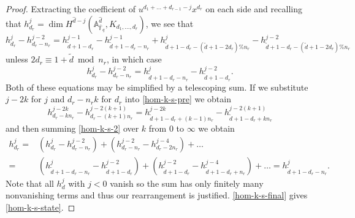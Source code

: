 \documentclass[11pt,letterpaper]{article}
\theoremstyle{definition}
\theoremstyle{remark}
\numberwithin{equation}{section}
\theoremstyle{dotless}
\renewcommand{\tilde}{\widetilde}
\begin{document}
\begin{proof}
Extracting the coefficient of $u^{ d_1 + \dots + d_{r-1}-j}  x^{d_r}$ on each side and recalling that $h^j_{d_r} =  \dim H^{\hat{d}-j} ( \mathbb A^{\hat{d} }_{\overline{\mathbb F}_q}, K_{d_1,\dots, d_r}) $, we see that
\begin{equation}\label{hom-k-g-pre}  h^j_{d_r} - h^{j-2}_{d_r-{n_r}}  =  h^{j-1 }_{\tilde{d} +1 -d_r} -  h^{j-1}_{\tilde{d}+1 -d_r-n_r} + h^j_{ \tilde{d}+1-d_r - ( \tilde{d}+1-2d_r)\%n_r}  -  h^{j-2} _{\tilde{d}+1-d_r - ( \tilde{d}+1-2d_r)\%n_r} \end{equation}
unless $2d_{r} \equiv 1 + \tilde{d} \bmod n_r$, in which case
\begin{equation}\label{hom-k-s-pre} h^j_{d_r} - h^{j-2}_{d_r-n_r} = h^j_{\tilde{d}+1 -d_r-n_r} - h^{j-2}_{ \tilde{d}+1-d_r }. \end{equation}
Both of these equations may be simplified by a telescoping sum. 
If we substitute $j-2k$ for $j$ and $d_r-n_rk$ for $d_r$ into \eqref{hom-k-s-pre} we obtain 
\begin{equation}\label{hom-k-s-2} h^{j-2k}_{d_r-kn_r} - h^{j-2(k+1) }_{d_r-(k+1) n_r} = h^{j-2k} _{\tilde{d}+1 -d_r+ (k-1) n_r} - h^{j-2(k+1) }_{ \tilde{d}+1-d_r+ kn_r } \end{equation}
and then summing \eqref{hom-k-s-2} over $k$ from $0$ to $\infty$ we obtain
\begin{equation}\label{hom-k-s-final} \begin{aligned} h^j_{d_r}=&  ( h^j_{d_r} - h^{j-2}_{d_r-n_r}) + ( h^{j-2}_{d_r-n_r} - h^{j-4}_{d_r-2n_r}) + \dots \\=&(h^j_{\tilde{d}+1 -d_r-n_r} - h^{j-2}_{ \tilde{d}+1-d_r }) + (h^{j-2}_{\tilde{d}+1 -d_r} - h^{j-4}_{ \tilde{d}+1-d_r +n_r  }) + \dots   = h^j_{\tilde{d}+1-d_r-n_r} .\end{aligned}\end{equation}
Note that all $h^j_d$ with $j<0$ vanish so the sum has only finitely many nonvanishing terms and thus our rearrangement is justified. \eqref{hom-k-s-final} gives \eqref{hom-k-s-state}.


\end{proof}
\end{document}
